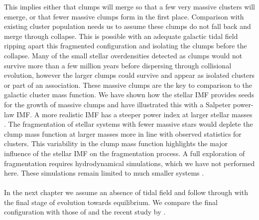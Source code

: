 This implies either that clumps will merge so that a few very massive clusters will emerge, or that fewer massive clumps form in the first place. Comparison with existing cluster population needs us to assume these clumps do not fall back and merge through collapse. This is possible with an adequate galactic tidal field ripping apart this fragmented configuration and isolating the clumps before the collapse. Many of the small stellar overdensities detected as clumps would not survive more than a few million years before dispersing through collisional evolution, however the larger clumps could survive and appear as isolated clusters or part of an association. These massive clumps   are the key to comparison to the galactic cluster mass function. We have shown how the stellar IMF provides seeds for the growth of massive clumps and have illustrated this with a Salpeter power-law IMF. A more realistic  IMF has a steeper power index at larger stellar masses \citep{Kroupa2002,Chabrier2005}. The fragmentation of stellar systems with fewer massive stars would deplete the clump mass function at larger masses more in line with observed statistics for clusters. 
This variability in the clump mass function highlights the major influence of the stellar IMF on the fragmentation process. A full exploration of fragmentation requires hydrodynamical simulations, which we have not performed here. These simulations remain limited to much smaller systems \citep{Bate2014,Lomax2014}.

\paragraph*{}
In the next chapter we assume an absence of tidal field and follow through with the final stage of evolution towards equilibrium. We compare the final configuration with those of \cite{Allison2009} and the recent study by \cite{Caputo2014}. 
